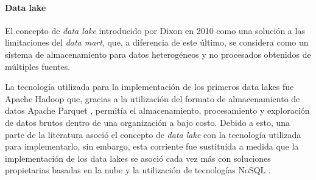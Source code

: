 \paragraph{Data lake\newline}

El concepto de \textit{data lake} introducido por Dixon \cite{dixon2010lake} en 2010 como una solución a las limitaciones del \textit{data mart}, que, a diferencia de este
\'ultimo, se considera como un sistema de almacenamiento para datos heterogéneos y no procesados obtenidos de múltiples fuentes.

La tecnología utilizada para la implementación de los primeros data lakes fue Apache Hadoop \cite{hadoop} que,
gracias a la utilización del formato de almacenamiento de datos Apache Parquet \cite{parquet},
permitía el almacenamiento,
procesamiento y exploración de datos brutos dentro de una organización a bajo costo.
Debido a esto, una parte de la literatura \cite{o2014embedding,fang2015managing} asoció el concepto de \textit{data lake} con la tecnología utilizada para implementarlo, 
sin embargo, esta corriente fue sustituída a medida que la implementación de los data lakes
se asoció cada vez más con soluciones propietarias basadas en la nube y la utilización de tecnologías NoSQL \cite{sirosh2016lake}.


